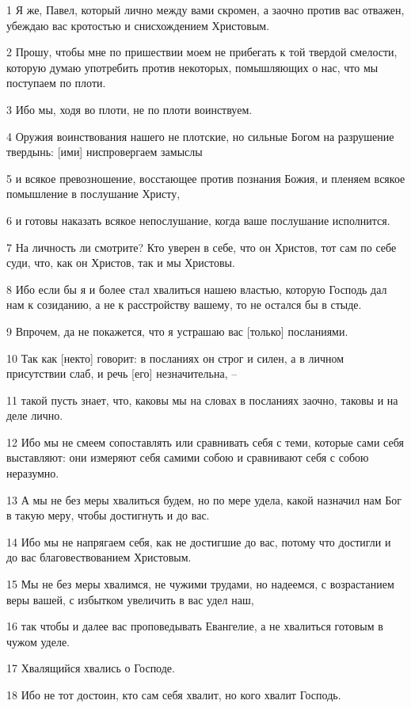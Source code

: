 \par 1 Я же, Павел, который лично между вами скромен, а заочно против вас отважен, убеждаю вас кротостью и снисхождением Христовым.
\par 2 Прошу, чтобы мне по пришествии моем не прибегать к той твердой смелости, которую думаю употребить против некоторых, помышляющих о нас, что мы поступаем по плоти.
\par 3 Ибо мы, ходя во плоти, не по плоти воинствуем.
\par 4 Оружия воинствования нашего не плотские, но сильные Богом на разрушение твердынь: [ими] ниспровергаем замыслы
\par 5 и всякое превозношение, восстающее против познания Божия, и пленяем всякое помышление в послушание Христу,
\par 6 и готовы наказать всякое непослушание, когда ваше послушание исполнится.
\par 7 На личность ли смотрите? Кто уверен в себе, что он Христов, тот сам по себе суди, что, как он Христов, так и мы Христовы.
\par 8 Ибо если бы я и более стал хвалиться нашею властью, которую Господь дал нам к созиданию, а не к расстройству вашему, то не остался бы в стыде.
\par 9 Впрочем, да не покажется, что я устрашаю вас [только] посланиями.
\par 10 Так как [некто] говорит: в посланиях он строг и силен, а в личном присутствии слаб, и речь [его] незначительна, --
\par 11 такой пусть знает, что, каковы мы на словах в посланиях заочно, таковы и на деле лично.
\par 12 Ибо мы не смеем сопоставлять или сравнивать себя с теми, которые сами себя выставляют: они измеряют себя самими собою и сравнивают себя с собою неразумно.
\par 13 А мы не без меры хвалиться будем, но по мере удела, какой назначил нам Бог в такую меру, чтобы достигнуть и до вас.
\par 14 Ибо мы не напрягаем себя, как не достигшие до вас, потому что достигли и до вас благовествованием Христовым.
\par 15 Мы не без меры хвалимся, не чужими трудами, но надеемся, с возрастанием веры вашей, с избытком увеличить в вас удел наш,
\par 16 так чтобы и далее вас проповедывать Евангелие, а не хвалиться готовым в чужом уделе.
\par 17 Хвалящийся хвались о Господе.
\par 18 Ибо не тот достоин, кто сам себя хвалит, но кого хвалит Господь.

